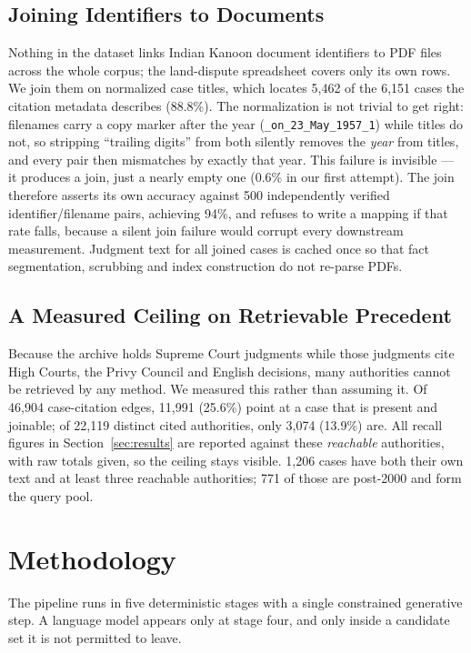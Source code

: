 \documentclass[10pt,conference]{IEEEtran}
\begin{document}
\subsection{Joining Identifiers to Documents}

Nothing in the dataset links Indian Kanoon document identifiers to PDF files across the
whole corpus; the land-dispute spreadsheet covers only its own rows. We join them on
normalized case titles, which locates 5{,}462 of the 6{,}151 cases the citation metadata
describes (88.8\%). The normalization is not trivial to get right: filenames carry a copy
marker after the year (\texttt{\_on\_23\_May\_1957\_1}) while titles do not, so stripping
``trailing digits'' from both silently removes the \emph{year} from titles, and every pair
then mismatches by exactly that year. This failure is invisible --- it produces a join, just
a nearly empty one (0.6\% in our first attempt). The join therefore asserts its own accuracy
against 500 independently verified identifier/filename pairs, achieving 94\%, and refuses to
write a mapping if that rate falls, because a silent join failure would corrupt every
downstream measurement. Judgment text for all joined cases is cached once so that fact
segmentation, scrubbing and index construction do not re-parse PDFs.

\subsection{A Measured Ceiling on Retrievable Precedent}
\label{sec:ceiling}

Because the archive holds Supreme Court judgments while those judgments cite High Courts,
the Privy Council and English decisions, many authorities cannot be retrieved by any method.
We measured this rather than assuming it. Of 46{,}904 case-citation edges, 11{,}991 (25.6\%)
point at a case that is present and joinable; of 22{,}119 distinct cited authorities, only
3{,}074 (13.9\%) are. All recall figures in Section~\ref{sec:results} are reported against
these \emph{reachable} authorities, with raw totals given, so the ceiling stays visible.
1{,}206 cases have both their own text and at least three reachable authorities; 771 of
those are post-2000 and form the query pool.

\section{Methodology}

The pipeline runs in five deterministic stages with a single constrained generative step.
A language model appears only at stage four, and only inside a candidate set it is not
permitted to leave.
\end{document}
